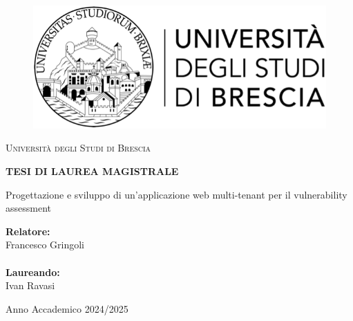 \begin{titlepage}
    \begin{center}
        \begin{figure}
            \centering
            \includegraphics{img/unibs.png}
        \end{figure}
        {\Large{\textsc{Università degli Studi di Brescia}}\par}
        {\par}
        \vspace{2cm}
        {{\bf TESI DI LAUREA MAGISTRALE}}
        \vspace{20mm}
    \end{center}
    \vspace{20mm}
 
    \begin{center}
        {\LARGE Progettazione e sviluppo di un'applicazione web multi-tenant per il vulnerability assessment}
    \end{center}
 
    \vspace{40mm}
    \noindent
        {\large{\bf Relatore:} \\Francesco Gringoli} \\ \\
        {\large{\bf Laureando:} \\Ivan Ravasi}
    \hfill
    \newline
    \vspace{5mm}
 
    \vfill
    \begin{center}
        {\large Anno Accademico 2024/2025}
    \end{center}
\end{titlepage}
\restoregeometry